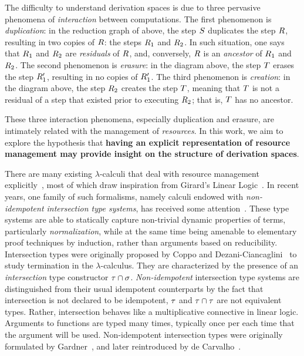 The difficulty to understand derivation spaces is due to three pervasive phenomena
of \emph{interaction} between computations.
The first phenomenon is \emph{duplication}:
in the reduction graph of above, the step $S$ duplicates the step $R$,
resulting in two copies of $R$: the steps $R_1$ and $R_2$.
In such situation, one says that $R_1$ and $R_2$ are \emph{residuals} of $R$,
and, conversely, $R$ is an \emph{ancestor} of $R_1$ and $R_2$.
The second phenomenon is \emph{erasure}:
in the diagram above, the step $T$ erases the step $R'_1$,
resulting in no copies of $R'_1$.
The third phenomenon is \emph{creation}:
in the diagram above, the step $R_2$ creates the step $T$,
meaning that $T$ is not a residual of a step that existed prior
to executing $R_2$; that is, $T$ has no ancestor.

These three interaction phenomena, especially duplication and erasure,
are intimately related with the management of \emph{resources}.
In this work, we aim to explore the hypothesis that {\bf having an explicit
representation of resource management may provide insight on
the structure of derivation spaces}.

There are many existing $\lambda$-calculi that deal with resource management explicitly~\cite{boudol1993lambda,ehrhard2003differential,kesner2007resource,kesner2009prismoid},
most of which draw inspiration from Girard's Linear Logic~\cite{girard1987linear}.
In recent years, one family of such formalisms, namely calculi endowed with
{\em non-idempotent intersection type systems},
has received some attention~\cite{ehrhard2012collapsing,bernadet2013non,bucciarelli2014inhabitation,bucciarelli2017non,kesner2016reasoning,thesisvial,KRV18}.
These type systems are able to statically capture non-trivial
dynamic properties of terms, particularly {\em normalization},
while at the same time being amenable to elementary proof techniques by induction,
rather than arguments based on reducibility.
Intersection types were originally proposed by
Coppo and Dezani-Ciancaglini~\cite{DBLP:journals/aml/CoppoD78}
to study termination in the $\lambda$-calculus.
They are characterized by the presence of an {\em intersection} type constructor $\tau \cap \sigma$.
{\em Non-idempotent} intersection type systems are distinguished from their usual idempotent
counterparts by the fact that intersection
is not declared to be idempotent, \ie $\tau$ and $\tau \cap \tau$ are not equivalent types.
Rather, intersection behaves like a multiplicative connective in linear logic.
Arguments to functions are typed many times, typically once
per each time that the argument will be used.
Non-idempotent intersection types were originally formulated by
Gardner~\cite{gardner1994discovering},
and later reintroduced by de Carvalho~\cite{carvalho2007semantiques}.

